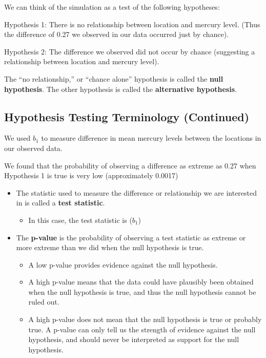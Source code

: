 \documentclass[]{book}
\providecommand{\tightlist}{%
  \setlength{\itemsep}{0pt}\setlength{\parskip}{0pt}}
\begin{document}
We can think of the simulation as a test of the following hypotheses:

Hypothesis 1: There is no relationship between location and mercury
level. (Thus the difference of 0.27 we observed in our data occurred
just by chance).

Hypothesis 2: The difference we observed did not occur by chance
(suggesting a relationship between location and mercury level).

The ``no relationship,'' or ``chance alone'' hypothesis is called the
\textbf{null hypothesis}. The other hypothesis is called the
\textbf{alternative hypothesis}.

\subsection{Hypothesis Testing Terminology
(Continued)}\label{hypothesis-testing-terminology-continued}

We used \(b_1\) to measure difference in mean mercury levels between the
locations in our observed data.

We found that the probability of observing a difference as extreme as
0.27 when Hypothesis 1 is true is very low (approximately 0.0017)

\begin{itemize}
\tightlist
\item
  The statistic used to measure the difference or relationship we are
  interested in is called a \textbf{test statistic}.

  \begin{itemize}
  \tightlist
  \item
    In this case, the test statistic is (\(b_1\))
  \end{itemize}
\item
  The \textbf{p-value} is the probability of observing a test statistic
  as extreme or more extreme than we did when the null hypothesis is
  true.

  \begin{itemize}
  \tightlist
  \item
    A low p-value provides evidence against the null hypothesis.\\
  \item
    A high p-value means that the data could have plausibly been
    obtained when the null hypothesis is true, and thus the null
    hypothesis cannot be ruled out.\\
  \item
    A high p-value does not mean that the null hypothesis is true or
    probably true. A p-value can only tell us the strength of evidence
    against the null hypothesis, and should never be interpreted as
    support for the null hypothesis.
  \end{itemize}
\end{itemize}
\end{document}
